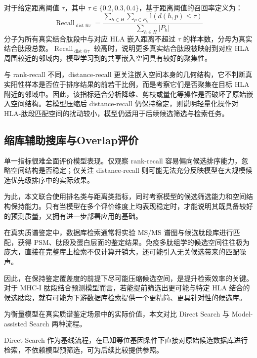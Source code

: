 对于给定距离阈值 $\tau$，其中 $\tau \in \{0.2,0.3,0.4\}$，基于距离阈值的召回率定义为：
\begin{equation}
\operatorname{Recall}_{\operatorname{dist}@\tau}
=
\frac{
\sum_{h \in H}
\sum_{p \in P_h}
\mathbb{I}\left(d(h,p)\le \tau\right)
}{
\sum_{h \in H}|P_h|
}
\end{equation}
分子为所有真实结合肽段中与对应 HLA 嵌入距离不超过 $\tau$ 的样本数，分母为真实结合肽段总数。$\operatorname{Recall}_{\operatorname{dist}@\tau}$ 较高时，说明更多真实结合肽段被映射到对应 HLA 周围较近的邻域内，模型学习到的共享嵌入空间具有较好的聚集性。

与 rank-recall 不同，distance-recall 更关注嵌入空间本身的几何结构，它不判断真实阳性样本是否位于排序结果的前若干比例，而是考察它们是否聚集在目标 HLA 附近的邻域中。因此，该指标适合分析降维、剪枝或量化等操作是否破坏了原始嵌入空间结构。若模型压缩后 distance-recall 仍保持稳定，则说明轻量化操作对 HLA-肽段匹配空间的扰动较小，模型仍适用于后续候选筛选与检索任务。

\subsection{缩库辅助搜库与Overlap评价}

单一指标很难全面评价模型表现。仅观察 rank-recall 容易偏向候选排序能力，忽略空间结构是否稳定；仅关注 distance-recall 则可能无法充分反映模型在大规模候选优先级排序中的实际效果。

为此，本文联合使用排名类与距离类指标，同时考察模型的候选筛选能力和空间结构保持能力。只有当模型在多个评价维度上均表现稳定时，才能说明其既具备较好的预测质量，又拥有进一步部署应用的基础。

\label{sec:direct-model-search}

在真实质谱鉴定中，数据库检索通常将实验 MS/MS 谱图与候选肽段库进行匹配，获得 PSM、肽段及蛋白层面的鉴定结果。免疫多肽组学的候选空间往往极为庞大，直接在完整库上检索不仅计算开销大，还可能引入无关候选带来的匹配噪声。

因此，在保持鉴定覆盖度的前提下尽可能压缩候选空间，是提升检索效率的关键。对于 MHC-I 肽段结合预测模型而言，若能提前筛选出更可能与特定 HLA 结合的候选肽段，就有可能为下游数据库检索提供一个更精简、更具针对性的候选库。

为衡量模型在真实质谱鉴定场景中的实际价值，本文对比 Direct Search 与 Model-assisted Search 两种流程。

Direct Search 作为基线流程，在已知等位基因条件下直接对原始候选数据库进行检索，不依赖模型预筛选，可为后续比较提供参照。

